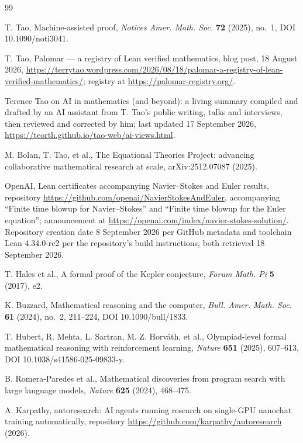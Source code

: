 \documentclass[11pt]{article}
\begin{document}
\begin{thebibliography}{99}

 T. Tao, Machine-assisted proof, \emph{Notices Amer. Math. Soc.} \textbf{72}
(2025), no.~1, DOI 10.1090/noti3041.

 T. Tao, Palomar --- a registry of Lean verified mathematics, blog post,
18 August 2026, \url{https://terrytao.wordpress.com/2026/08/18/palomar-a-registry-of-lean-verified-mathematics/};
registry at \url{https://palomar-registry.org/}.

 Terence Tao on AI in mathematics (and beyond): a living summary
compiled and drafted by an AI assistant from T. Tao's public writing, talks and interviews,
then reviewed and corrected by him; last updated 17 September 2026,
\url{https://teorth.github.io/tao-web/ai-views.html}.

 M. Bolan, T. Tao, et al., The Equational Theories Project: advancing
collaborative mathematical research at scale, arXiv:2512.07087 (2025).

 OpenAI, Lean certificates accompanying Navier--Stokes and Euler results,
repository \url{https://github.com/openai/NavierStokesAndEuler}, accompanying ``Finite time
blowup for Navier--Stokes'' and ``Finite time blowup for the Euler equation''; announcement at
\url{https://openai.com/index/navier-stokes-solution/}. Repository creation date 8 September
2026 per GitHub metadata and toolchain Lean 4.34.0-rc2 per the repository's build instructions,
both retrieved 18 September 2026.

 T. Hales et al., A formal proof of the Kepler conjecture, \emph{Forum
Math. Pi} \textbf{5} (2017), e2.

 K. Buzzard, Mathematical reasoning and the computer, \emph{Bull. Amer.
Math. Soc.} \textbf{61} (2024), no.~2, 211--224, DOI 10.1090/bull/1833.

 T. Hubert, R. Mehta, L. Sartran, M. Z. Horv\'ath, et al.,
Olympiad-level formal mathematical reasoning with reinforcement learning, \emph{Nature}
\textbf{651} (2025), 607--613, DOI 10.1038/s41586-025-09833-y.

 B. Romera-Paredes et al., Mathematical discoveries from program search
with large language models, \emph{Nature} \textbf{625} (2024), 468--475.

 A. Karpathy, autoresearch: AI agents running research on single-GPU
nanochat training automatically, repository \url{https://github.com/karpathy/autoresearch}
(2026).


\end{thebibliography}
\end{document}
